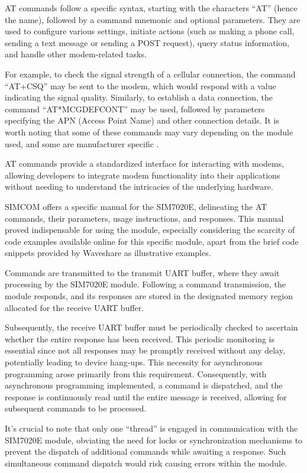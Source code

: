 AT commands follow a specific syntax, starting with the characters ``AT'' (hence the name), 
followed by a command mnemonic and optional parameters. They are used to configure various 
settings, initiate actions (such as making a phone call, sending a text message or sending a POST 
request), query status information, and handle other modem-related tasks.

For example, to check the signal strength of a cellular connection, the command ``AT+CSQ'' may be 
sent to the modem, which would respond with a value indicating the signal quality. Similarly, to 
establish a data connection, the command ``AT*MCGDEFCONT'' may be used, followed by parameters 
specifying the APN (Access Point Name) and other connection details. It is worth noting that some 
of these commands may vary depending on the module used, and some are manufacturer specific 
\cite{sim7020e_atcommandsmanual}.

AT commands provide a standardized interface for interacting with modems, allowing developers to 
integrate modem functionality into their applications without needing to understand the intricacies 
of the underlying hardware.

SIMCOM offers a specific manual for the SIM7020E, delineating the AT commands, their parameters, 
usage instructions, and responses. This manual proved indispensable for using the module, 
especially considering the scarcity of code examples available online for this specific module, 
apart from the brief code snippets provided by Waveshare as illustrative examples.

Commands are transmitted to the transmit UART buffer, where they await processing by the SIM7020E 
module. Following a command transmission, the module responds, and its responses are stored in the 
designated memory region allocated for the receive UART buffer.

Subsequently, the receive UART buffer must be periodically checked to ascertain whether the entire 
response has been received. This periodic monitoring is essential since not all responses may be 
promptly received without any delay, potentially leading to device hang-ups. This necessity for 
asynchronous programming arose primarily from this requirement. Consequently, with asynchronous 
programming implemented, a command is dispatched, and the response is continuously read until the 
entire message is received, allowing for subsequent commands to be processed.

It's crucial to note that only one ``thread'' is engaged in communication with the SIM7020E module, 
obviating the need for locks or synchronization mechanisms to prevent the dispatch of additional 
commands while awaiting a response. Such simultaneous command dispatch would risk causing errors 
within the module.

